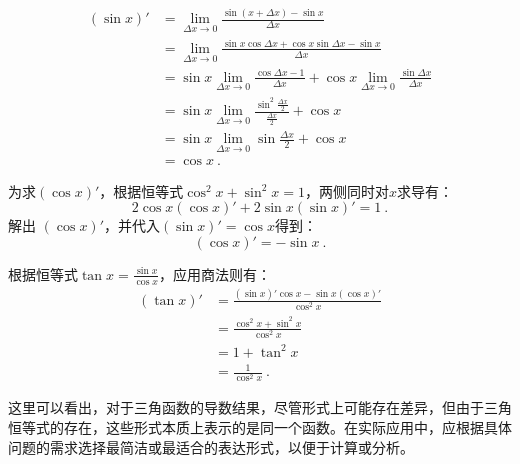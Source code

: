 \begin{equation}
\begin{split}
\left(\sin x\right)' &= \lim_{\Delta x \to 0}\frac{\sin (x+\Delta x)-\sin x}{\Delta x} \\
&= \lim_{\Delta x \to 0}\frac{\sin x\cos\Delta x+\cos x\sin\Delta x-\sin x}{\Delta x} \\
&= \sin x\lim_{\Delta x \to 0}\frac{\cos\Delta x-1}{\Delta x}+\cos x\lim_{\Delta x \to 0}\frac{\sin\Delta x} {\Delta x}\\
&= \sin x\lim_{\Delta x \to 0}\frac{\sin^2\frac{\Delta x}{2}}{\frac{\Delta x}{2}}+\cos x\\
&= \sin x\lim_{\Delta x \to 0}\sin\frac{\Delta x}{2}+\cos x\\
&=\cos x~.
\end{split}
\end{equation}

为求$(\cos x)'$，根据恒等式$\cos^2 x+\sin^2 x=1$，两侧同时对$x$求导有：
\begin{equation}
2\cos x(\cos x)'+2\sin x(\sin x)'=1~.
\end{equation}
解出 $(\cos x)'$，并代入$(\sin x)'=\cos x$得到：
\begin{equation}
(\cos x)'=-\sin x~.
\end{equation}

根据恒等式$\displaystyle\tan x=\frac{\sin x}{\cos x}$，应用商法则有：
\begin{equation}
\begin{split}
(\tan x)'&=\frac{(\sin x)'\cos x-\sin x(\cos x)'}{\cos^2 x}\\
&=\frac{\cos^2 x+\sin^2 x}{\cos^2 x}\\
&=1+\tan^2 x\\
&=\frac{1}{\cos^2 x}~.
\end{split}
\end{equation}

这里可以看出，对于三角函数的导数结果，尽管形式上可能存在差异，但由于三角恒等式的存在，这些形式本质上表示的是同一个函数。在实际应用中，应根据具体问题的需求选择最简洁或最适合的表达形式，以便于计算或分析。